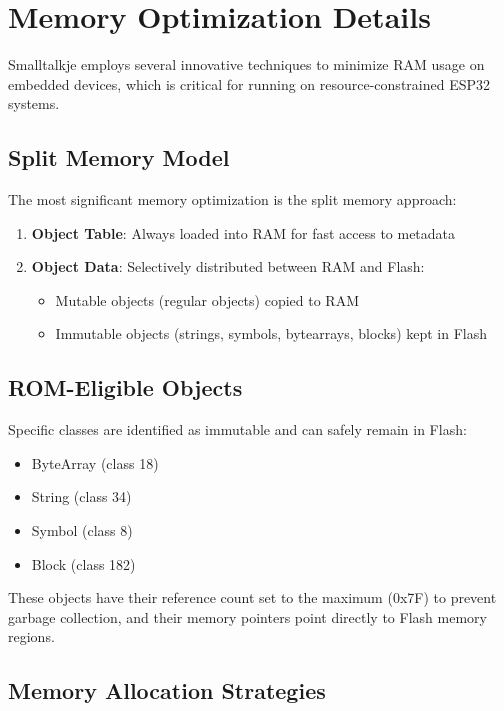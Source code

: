 \documentclass[12pt,a4paper]{report}
\begin{document}
\chapter{Memory Optimization Details}

Smalltalkje employs several innovative techniques to minimize RAM usage on embedded devices, which is critical for running on resource-constrained ESP32 systems.

\section{Split Memory Model}

The most significant memory optimization is the split memory approach:

\begin{enumerate}
    \item \textbf{Object Table}: Always loaded into RAM for fast access to metadata
    \item \textbf{Object Data}: Selectively distributed between RAM and Flash:
    \begin{itemize}
        \item Mutable objects (regular objects) copied to RAM
        \item Immutable objects (strings, symbols, bytearrays, blocks) kept in Flash
    \end{itemize}
\end{enumerate}

\section{ROM-Eligible Objects}

Specific classes are identified as immutable and can safely remain in Flash:

\begin{itemize}
    \item ByteArray (class 18)
    \item String (class 34)
    \item Symbol (class 8)
    \item Block (class 182)
\end{itemize}

These objects have their reference count set to the maximum (0x7F) to prevent garbage collection, and their memory pointers point directly to Flash memory regions.

\section{Memory Allocation Strategies}
\end{document}
